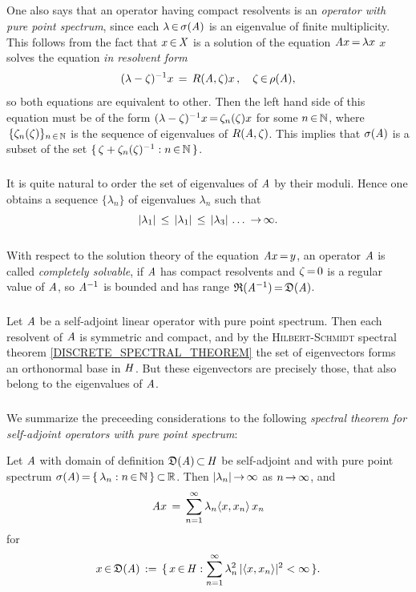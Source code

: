 \documentclass[11pt,twoside]{article}
\begin{document}
\subparagraph*{}
One also says that an operator having compact resolvents
is an \textit{operator with pure point spectrum},
since each $\lambda {\,\in\,} \sigma(\mathit{A} )$
is an eigenvalue of finite multiplicity.
This follows from the fact
that $x {\,\in\,} \mathit{X}$ is a solution of the equation $\mathit{A}  x {\,=\,} \lambda x$
\iff
$x$ solves the equation \textit{in resolvent form}
\[
(\lambda - \zeta)^{-1} x \,=\, R(\mathit{A} ,\zeta) x\,,
\quad \zeta {\,\in\,} \rho(\mathit{A} ),
\]
so both equations are equivalent to other.
Then the left hand side of this equation  must be of the form
$(\lambda - \zeta)^{-1} x  {\,=\,} \zeta_n(\zeta) x$ for some $n {\,\in\,} {\mathbb{N}}$,
where $\,\{\zeta_n(\zeta)\}_{n {\,\in\,} {\mathbb{N}}}$
is the sequence of eigenvalues of $R(\mathit{A} ,\zeta)$.
This implies that $\sigma(\mathit{A})$ is a subset of the set
$\{\,\zeta + \zeta_n(\zeta)^{-1}: n {\,\in\,} {\mathbb{N}}\,\}$.

\subparagraph*{}
It is quite natural to order the set of eigenvalues of $\mathit{A}$ by their moduli.
Hence one obtains a sequence $\{\lambda_n\}$ of eigenvalues $\lambda_n$
such that
\[
\abs{\lambda_1} \, \leq \, \abs{\lambda_1} \, \leq \, \abs{\lambda_3} \, \dots
\, \xto \infty.
\]

\subparagraph*{}
With respect to the solution theory of the equation $\mathit{A} x {\,=\,} y$,
an operator $\mathit{A}$ is called \textit{completely solvable},
if $\mathit{A}$ has compact resolvents and $\zeta {\,=\,} 0$ is a regular value of $\mathit{A}$,
so $\mathit{A}^{-1}$ is bounded
and has range $\mathfrak{R}(\mathit{A}^{-1}) {\,=\,} \mathfrak{D}(\mathit{A})$.

\subsubsection*{}
Let $\mathit{A}$ be a self-adjoint linear operator with pure point spectrum.
Then each resolvent of $\mathit{A}$ is symmetric and compact, 
and by the \textsc{Hilbert-Schmidt} spectral theorem
\ref{DISCRETE_SPECTRAL_THEOREM} 
the set of eigenvectors forms an orthonormal base in $\mathit{H}$.
But these eigenvectors are precisely those,
that also belong to the eigenvalues of $\mathit{A}$.

\subparagraph*{}
We summarize the preceeding considerations to the following
\textit{spectral theorem for self-adjoint operators with pure point spectrum}:

\begin{theorem}\label{SPECTRAL_THEOREM_FOR_OPERATORS_WITH_COMPACT_RESOLVENTS}
Let $\mathit{A}$ with domain of definition $\mathfrak{D}(\mathit{A}) {\,\subset\,} \mathit{H}$
be self-adjoint and with pure point spectrum
$\sigma(\mathit{A}) {\,=\,} \{\, \lambda_n: n {\,\in\,} {\mathbb{N}} \,\} {\,\subset\,} {\mathbb{R}}$.
Then $\abs{\lambda_n} \xto \infty$ as $n {\,\to\,} \infty$, and
\[
\mathit{A} x \,=\, \sum_{n=1}^{\infty} \lambda_n \langle x,x_n \rangle \, x_n
\]
for
\[
x \xeof \domain{\linA} \eqdef
\{ \, x \xeof \hilH:
\sum_{n=1}^{\infty} \lambda_n^2 \, \abs{\scalar{x}{x_n}} ^2 < \infty \, \}.
\]
\end{theorem}
\end{document}
